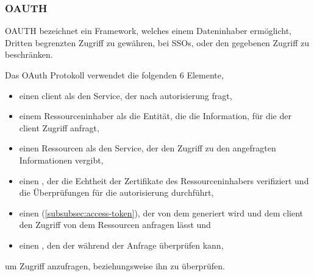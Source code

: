 \subsubsection[OAuth]{\acf{OAUTH}}\label{subsubsec:oauth}
\ac{OAUTH} bezeichnet ein Framework, welches einem Dateninhaber ermöglicht, Dritten begrenzten Zugriff zu gewähren, \zbol bei \acp{SSO}, oder den gegebenen Zugriff zu beschränken.\autocites[\vglf][]{rfc6749}[\vglf][]{OAuthWebProtocol:2012}

Das OAuth Protokoll verwendet die folgenden 6 Elemente,
\begin{itemize}
    \item einen \gls{client} als den Service, der nach \gls{autorisierung} fragt,
    \item einem Ressourceninhaber als die Entität, die die Information, für die der \gls{client} Zugriff anfragt,
    \item  einen Ressourcen als den Service, der den Zugriff zu den angefragten Informationen vergibt,
    \item einen , der die Echtheit der Zertifikate des Ressourceninhabers verifiziert und die Überprüfungen für die \gls{autorisierung} durchführt,
    \item einen  (\autoref{subsubsec:access-token}), der von dem  generiert wird und dem \gls{client} den Zugriff von dem Ressourcen anfragen lässt und
    \item einen , den der  während der Anfrage überprüfen kann,
\end{itemize}
um Zugriff anzufragen, beziehungsweise ihn zu überprüfen.\autocite[\vglf][]{OAuthWebProtocol:2012}


